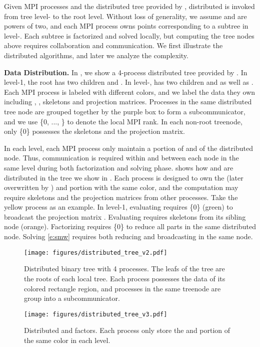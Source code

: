 Given  MPI processes and the distributed tree provided by \ASKIT{}, 
distributed \IASKIT{} is invoked from tree level- to the
root level. Without loss of generality, we assume  and  are powers 
of two, and each MPI process owns  points corresponding to a 
subtree in level-.
Each subtree is factorized and solved locally, but computing the tree nodes
above requires collaboration and communication.
We first illustrate the distributed algorithms, and later we analyze the
complexity. 

\textbf{Data Distribution.}
In , we show a 4-process distributed tree provided
by \ASKIT{}. In level-1, the root has two children  and .
In level-,  has two children  and 
as well as .
Each MPI process is labeled with different colors, and we label the
data they own including , , skeletons and projection matrices.
Processes in the same distributed tree node are grouped together
by the purple box to form a subcommunicator, and we use 
\{0, ..., \} to denote the local MPI rank. 
In each non-root treenode, only \{0\} possesses the skeletons
and the projection matrix.

In each level, each MPI process only maintain a portion of 
 and  of the distributed node.
Thus, communication is required within and between each node in the 
same level during both factorization and solving phase.
 shows how  and  are distributed in the
tree we show in .
Each process is designed to own the  (later overwritten by ) 
and  portion with the same color, and the computation may require 
skeletons and the projection matrices from other processes.
Take the yellow process as an example.
In level-1, evaluating  requires \{0\} (green) to broadcast the 
projection matrix . 
Evaluating  requires skeletons  from 
its sibling node (orange).
Factorizing  requires \{0\} to reduce all 
parts in the same distributed node.
Solving \eqref{e:smw} requires both reducing  and broadcasting
 in the same node.  

\begin{figure}[!t]
  \centering
  \texttt{[image: figures/distributed\_tree\_v2.pdf]}
  \caption{Distributed binary tree with 4 processes. The leafs of the 
  tree are the roots of each local tree.
  Each process possesses the data of its colored rectangle 
  region, and processes in the same treenode are group into
  a subcommunicator.}
  \label{fig:tree}
\end{figure}

\begin{figure}[!t]
  \centering
  \texttt{[image: figures/distributed\_tree\_v3.pdf]}
  \caption{Distributed  and  factors. Each process
  only store the  and  portion of the same color in each
  level.}
  \label{fig:matrix}
\end{figure}


